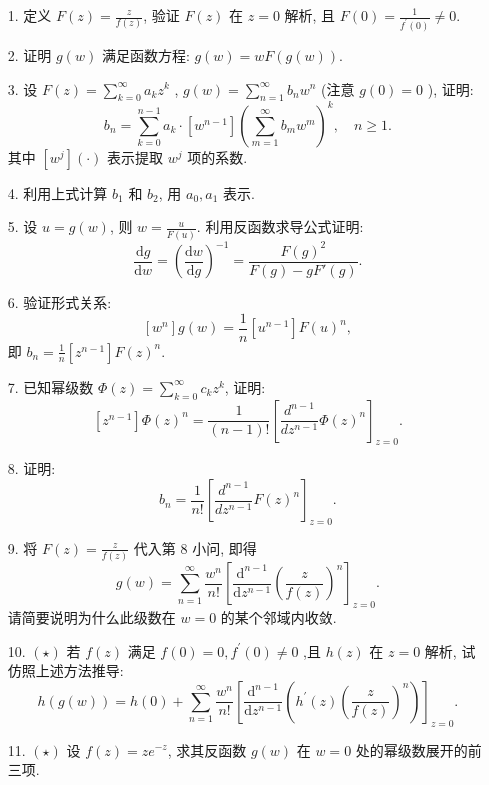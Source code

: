 \begin{enumerate}
    \item[1.]定义 \(\displaystyle F(z) = \frac{z}{f(z)}\), 验证 \(F(z)\) 在 \(z = 0\) 解析, 且 \(\displaystyle F(0) = \frac{1}{f^{\prime}(0)}\neq 0\).
    \item[2.]证明 \(g(w)\) 满足函数方程: \(\displaystyle g(w) = wF(g(w))\).
    \item[3.]设 \(\displaystyle F(z) = \sum_{k = 0}^{\infty}a_{k}z^{k}\) , \(\displaystyle g(w) = \sum_{n = 1}^{\infty}b_{n}w^{n}\) 
    (注意 \(g(0) = 0\) ), 证明:
    \[\displaystyle b_{n} = \sum_{k = 0}^{n - 1}a_{k}\cdot [w^{n - 1}]\left(\sum_{m = 1}^{\infty}b_{m}w^{m}\right)^{k}, \quad n\geq 1.\]
    其中 \([w^{j}](\cdot)\) 表示提取 \(w^{j}\) 项的系数.
    \item[4.]利用上式计算 \(b_{1}\) 和 \(b_{2}\), 用 \(\displaystyle a_{0},a_{1}\) 表示.
    \item[5.]设 \(\displaystyle  u = g(w)\), 则 \(\displaystyle w = \frac{u}{F(u)}\). 利用反函数求导公式证明:
    \[\displaystyle \frac{\mathrm{d}g}{\mathrm{d}w} = \left(\frac{\mathrm{d}w}{\mathrm{d}g}\right)^{-1} = \frac{F(g)^{2}}{F(g) - gF'(g)}.\]
    \item[6.]验证形式关系:
    \[\displaystyle[w^{n}]g(w) = \frac{1}{n} [u^{n - 1}]F(u)^{n},\]
    即 \(\displaystyle b_{n} = \frac{1}{n} [z^{n - 1}]F(z)^{n}\).
    \item[7.]已知幂级数 \(\displaystyle \Phi (z) = \sum_{k = 0}^{\infty}c_{k}z^{k}\), 证明:
    \[\displaystyle [z^{n - 1}]\Phi (z)^{n} = \frac{1}{(n - 1)!}\left[\frac{d^{n - 1}}{dz^{n - 1}}\Phi (z)^{n}\right]_{z = 0}.\]
    \item[8.]证明:
    \[\displaystyle b_{n} = \frac{1}{n!}\left[\frac{d^{n - 1}}{dz^{n - 1}} F(z)^{n}\right]_{z = 0}.\]
    \item[9.]将 \(\displaystyle F(z) = \frac{z}{f(z)}\) 代入第 8 小问, 即得
    \[\displaystyle g(w) = \sum_{n = 1}^{\infty}\frac{w^{n}}{n!}\left[\frac{\mathrm{d}^{n - 1}}{\mathrm{d}z^{n - 1}}\left(\frac{z}{f(z)}\right)^{n}\right]_{z = 0}.\]
    请简要说明为什么此级数在 \(w = 0\) 的某个邻域内收敛.
    \item[10.]$(\star)$ 若 \(f(z)\) 满足 \(\displaystyle f(0) = 0,f^{\prime}(0)\neq 0\) ,且 \(h(z)\) 在 \(z = 0\) 解析, 试仿照上述方法推导:
    \[\displaystyle h(g(w)) = h(0) + \sum_{n = 1}^{\infty}\frac{w^{n}}{n!}\left[\frac{\mathrm{d}^{n - 1}}{\mathrm{d}z^{n - 1}}\left(h^{\prime}(z)\left(\frac{z}{f(z)}\right)^{n}\right)\right]_{z = 0}.\]
    \item[11.]$(\star)$ 设 \(\displaystyle f(z) = ze^{-z}\), 求其反函数 \(g(w)\) 在 \(w = 0\) 处的幂级数展开的前三项.
\end{enumerate}

